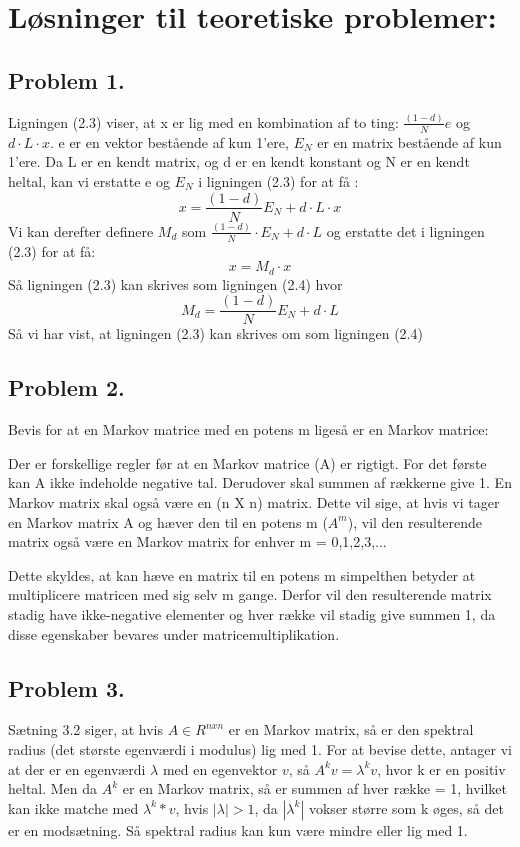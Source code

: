 
\section{Løsninger til teoretiske problemer:}


\subsection*{Problem 1.}

Ligningen (2.3) viser, at x er lig med en kombination af to ting: $\frac{(1-d)}{N}e$ og $d\cdot L\cdot x$. e er en vektor bestående af kun 1'ere, $E_N$ er en matrix bestående af kun 1'ere.
Da L er en kendt matrix, og d er en kendt konstant og N er en kendt heltal, kan vi erstatte e og $E_N$ i ligningen (2.3) for at få :
$$x = \frac{(1-d)}{N}E_N + d\cdot L\cdot x$$
Vi kan derefter definere $M_d$ som $\frac{(1-d)}{N} \cdot E_N + d \cdot L$
og erstatte det i ligningen (2.3) for at få:
$$x = M_d \cdot x$$
Så ligningen (2.3) kan skrives som ligningen (2.4) hvor $$M_d = \frac{(1-d)}{N}E_N + d \cdot L$$
Så vi har vist, at ligningen (2.3) kan skrives om som ligningen (2.4)



\subsection*{Problem 2.}

Bevis for at en Markov matrice med en potens m ligeså er en Markov matrice:

Der er forskellige regler før at en Markov matrice (A) er rigtigt. For det første kan A ikke indeholde negative tal. Derudover skal summen af rækkerne give 1. En Markov matrix skal også være en (n X n) matrix. Dette vil sige, at hvis vi tager en Markov matrix A og hæver den til en potens m ($A^m$), vil den resulterende matrix også være en Markov matrix for enhver m = 0,1,2,3,...

Dette skyldes, at kan hæve en matrix til en potens m simpelthen betyder at multiplicere matricen med sig selv m gange. Derfor vil den resulterende matrix stadig have ikke-negative elementer og hver række vil stadig give summen 1, da disse egenskaber bevares under matricemultiplikation.

\subsection*{Problem 3.}

Sætning 3.2 siger, at hvis $A \in R^{nxn}$ er en Markov matrix, så er den spektral radius (det største egenværdi i modulus) lig med 1. For at bevise dette, antager vi at der er en egenværdi $\lambda$ med en egenvektor $v$, så $A^kv = \lambda^kv$, hvor k er en positiv heltal. Men da $A^k$ er en Markov matrix, så er summen af hver række = 1, hvilket kan ikke matche med $\lambda^k*v$, hvis $|\lambda| > 1$, da $|\lambda^k|$ vokser større som k øges, så det er en modsætning. Så spektral radius kan kun være mindre eller lig med 1.

